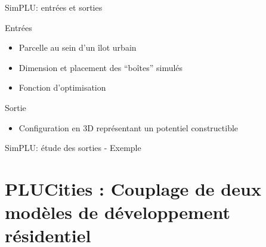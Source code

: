 \documentclass[xcolor=table]{beamer}
\newcommand\FontPetit{\fontsize{8}{6}\selectfont}
\begin{document}
\begin{frame}{SimPLU: entrées et sorties}
	\begin{block}{Entrées}
		\begin{itemize}
			\item Parcelle au sein d'un îlot urbain
			\item Dimension et placement des ``boîtes'' simulés
			\item Fonction d'optimisation
		\end{itemize}
	\end{block}
	\begin{block}{Sortie}
		\begin{itemize}
			\item Configuration en 3D représentant un potentiel constructible
		\end{itemize}
	\end{block}
	\begin{block}
	\end{block}		
\end{frame}

\begin{frame}{SimPLU: étude des sorties - Exemple}
	\\
	\FontPetit{}
\end{frame}

\section[PLUCities]{PLUCities : Couplage de deux modèles de développement résidentiel}
\end{document}
